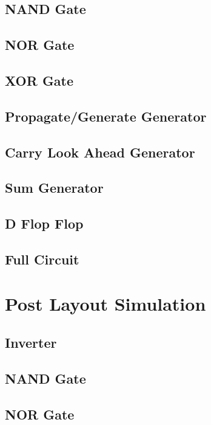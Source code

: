 \documentclass[conference]{IEEEtran}
\begin{document}
\subsection{NAND Gate}

\subsection{NOR Gate}

\subsection{XOR Gate}

\subsection{Propagate/Generate Generator}

\subsection{Carry Look Ahead Generator}

\subsection{Sum Generator}

\subsection{D Flop Flop}

\subsection{Full Circuit}

\section{Post Layout Simulation}

\subsection{Inverter}

\subsection{NAND Gate}

\subsection{NOR Gate}
\end{document}
